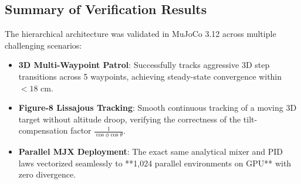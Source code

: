 \documentclass[11pt,a4paper]{article}
\begin{document}
\subsection{Summary of Verification Results}
The hierarchical architecture was validated in MuJoCo 3.12 across multiple challenging scenarios:
\begin{itemize}
    \item \textbf{3D Multi-Waypoint Patrol}: Successfully tracks aggressive 3D step transitions across 5 waypoints, achieving steady-state convergence within $< 18\text{ cm}$.
    \item \textbf{Figure-8 Lissajous Tracking}: Smooth continuous tracking of a moving 3D target without altitude droop, verifying the correctness of the tilt-compensation factor $\frac{1}{\cos\phi \cos\theta}$.
    \item \textbf{Parallel MJX Deployment}: The exact same analytical mixer and PID laws vectorized seamlessly to **1,024 parallel environments on GPU** with zero divergence.
\end{itemize}
\end{document}
